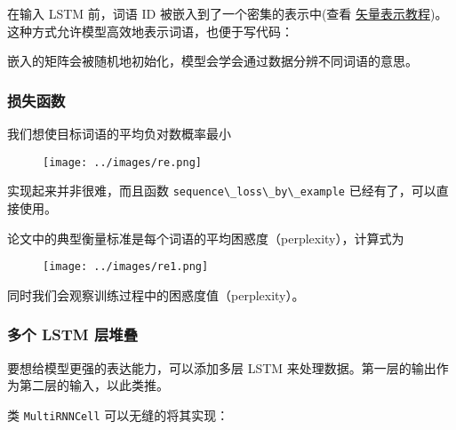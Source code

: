 在输入 LSTM 前，词语 ID 被嵌入到了一个密集的表示中(查看
\href{tensorflow-zh/SOURCE/tutorials/word2vec/index.md}{矢量表示教程})。这种方式允许模型高效地表示词语，也便于写代码：

\begin{Shaded}
\begin{Highlighting}[]
\OperatorTok{=} 
\end{Highlighting}
\end{Shaded}

嵌入的矩阵会被随机地初始化，模型会学会通过数据分辨不同词语的意思。

\subsubsection{损失函数 }\label{ux635fux5931ux51fdux6570}

我们想使目标词语的平均负对数概率最小

\begin{figure}[htbp]
\centering
\texttt{[image: ../images/re.png]}
\caption{}
\end{figure}

实现起来并非很难，而且函数 \lstinline{sequence\_loss\_by\_example}
已经有了，可以直接使用。

论文中的典型衡量标准是每个词语的平均困惑度（perplexity），计算式为

\begin{figure}[htbp]
\centering
\texttt{[image: ../images/re1.png]}
\caption{}
\end{figure}

同时我们会观察训练过程中的困惑度值（perplexity）。

\subsubsection{多个 LSTM 层堆叠
}\label{ux591aux4e2a-lstm-ux5c42ux5806ux53e0}

要想给模型更强的表达能力，可以添加多层 LSTM
来处理数据。第一层的输出作为第二层的输入，以此类推。

类 \lstinline{MultiRNNCell} 可以无缝的将其实现：

